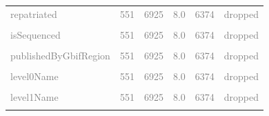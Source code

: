 \documentclass[sn-apa,pdflatex]{sn-jnl}
\begin{document}
\begin{longtable}[t]{lrrrrl}
\textcolor{gray}{repatriated} & \textcolor{gray}{551} & \textcolor{gray}{6925} & \textcolor{gray}{8.0} & \textcolor{gray}{6374} & \textcolor{gray}{dropped}\\
\addlinespace
\textcolor{gray}{\cellcolor{gray!10}{projectId}} & \textcolor{gray}{\cellcolor{gray!10}{551}} & \textcolor{gray}{\cellcolor{gray!10}{6925}} & \textcolor{gray}{\cellcolor{gray!10}{8.0}} & \textcolor{gray}{\cellcolor{gray!10}{6374}} & \textcolor{gray}{\cellcolor{gray!10}{dropped}}\\
\textcolor{gray}{isSequenced} & \textcolor{gray}{551} & \textcolor{gray}{6925} & \textcolor{gray}{8.0} & \textcolor{gray}{6374} & \textcolor{gray}{dropped}\\
\textcolor{gray}{\cellcolor{gray!10}{gbifRegion}} & \textcolor{gray}{\cellcolor{gray!10}{551}} & \textcolor{gray}{\cellcolor{gray!10}{6925}} & \textcolor{gray}{\cellcolor{gray!10}{8.0}} & \textcolor{gray}{\cellcolor{gray!10}{6374}} & \textcolor{gray}{\cellcolor{gray!10}{dropped}}\\
\textcolor{gray}{publishedByGbifRegion} & \textcolor{gray}{551} & \textcolor{gray}{6925} & \textcolor{gray}{8.0} & \textcolor{gray}{6374} & \textcolor{gray}{dropped}\\
\textcolor{gray}{\cellcolor{gray!10}{level0Gid}} & \textcolor{gray}{\cellcolor{gray!10}{551}} & \textcolor{gray}{\cellcolor{gray!10}{6925}} & \textcolor{gray}{\cellcolor{gray!10}{8.0}} & \textcolor{gray}{\cellcolor{gray!10}{6374}} & \textcolor{gray}{\cellcolor{gray!10}{dropped}}\\
\addlinespace
\textcolor{gray}{level0Name} & \textcolor{gray}{551} & \textcolor{gray}{6925} & \textcolor{gray}{8.0} & \textcolor{gray}{6374} & \textcolor{gray}{dropped}\\
\textcolor{gray}{\cellcolor{gray!10}{level1Gid}} & \textcolor{gray}{\cellcolor{gray!10}{551}} & \textcolor{gray}{\cellcolor{gray!10}{6925}} & \textcolor{gray}{\cellcolor{gray!10}{8.0}} & \textcolor{gray}{\cellcolor{gray!10}{6374}} & \textcolor{gray}{\cellcolor{gray!10}{dropped}}\\
\textcolor{gray}{level1Name} & \textcolor{gray}{551} & \textcolor{gray}{6925} & \textcolor{gray}{8.0} & \textcolor{gray}{6374} & \textcolor{gray}{dropped}\\
\textcolor{gray}{\cellcolor{gray!10}{level2Gid}} & \textcolor{gray}{\cellcolor{gray!10}{551}} & \textcolor{gray}{\cellcolor{gray!10}{6925}} & \textcolor{gray}{\cellcolor{gray!10}{8.0}} & \textcolor{gray}{\cellcolor{gray!10}{6374}} & \textcolor{gray}{\cellcolor{gray!10}{dropped}}\\

\end{longtable}
\end{document}
